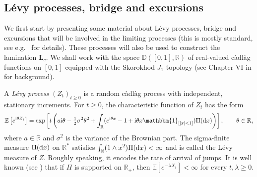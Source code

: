 \documentclass[AHL,XML,longabstracts,Unicode]{cedram}
\newcommand{\R}{\mathbb{R}}
\newcommand{\D}{\mathbb{D}}
\def\d{{\rm d}}
\newcommand\Es[1]{\mathbb{E}\left[#1\right]}
\begin{document}
\subsection{L\'evy processes, bridge and excursions}
\label{ssec:Levy}
We first start by presenting some material about L\'evy processes, bridge and excursions that will be involved in the limiting processes (this is mostly standard, see e.g.~\cite{Ber96,Kyp06} for details).
These processes will also be used to construct the lamination $\mathbf{L}_{c}$. We shall work with the space ${\D}([0, 1], \R)$ of real-valued c\`adl\`ag functions on $[0,1]$ equipped with the Skorokhod $J_{1}$ topology (see Chapter VI in \cite{JS03} for background).

A \emph{L\'evy process}  $(Z_t)_{t \ge 0}$ is a random c\`adl\`ag process with independent, stationary increments. For $t \geq 0$, the characteristic function of $Z_{t}$ has the form
\[\Es{e^{\textrm{i}\theta Z_{t}}} = \exp\left[ t \left( a\textrm{i} \theta -\tfrac{1}{2}\sigma^2 \theta^2 + \int_{\R}
(e^{\textrm{i}\theta x} -1 +\textrm{i}\theta x \mathbbm{1}_{[|x| <1]}) \Pi({\d}x)\right) \right], \qquad \theta \in \R,\]
where $a \in \R$ and $\sigma^2$ is the variance of the Brownian part.
The sigma-finite measure $\Pi({\d}x)$ on $\R^{*}$ satisfies $\int_{\R} (1 \wedge x^{2}) \Pi({\d}x) < \infty$ and is called the {L\'evy measure} of $Z$. Roughly speaking, it encodes the rate of arrival of jumps. It is well known (see \cite[Theorem 3.6]{Kyp06}) that if $\Pi$ is supported on $\R_{+}$, then $\Es{e^{-\lambda X_{t}}}<\infty$ for every $t, \lambda \geq 0$.
\end{document}
